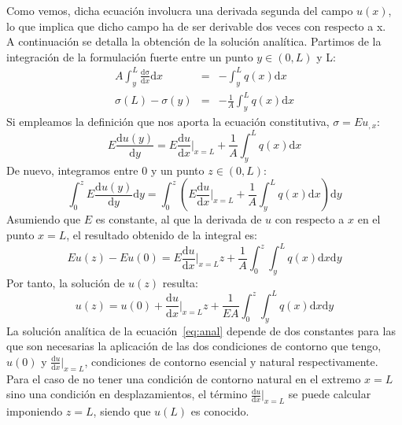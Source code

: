 Como vemos, dicha ecuación involucra una derivada segunda del campo \(u(x)\), lo que implica que dicho campo ha de ser derivable dos veces con respecto a x.\\

A continuación se detalla la obtención de la solución analítica. Partimos de la integración de la formulación fuerte entre un punto $y\in(0,L)$ y L:
\begin{eqnarray}
A \int_y^L \frac{\mathrm{d \sigma}}{\mathrm{d} x} \mathrm{d} x &=& -\int_y^L  q(x) \mathrm{d} x \\
\sigma(L)-\sigma(y) &=& -\frac{1}{A}\int_y^L  q(x) \mathrm{d} x 
\end{eqnarray}
Si empleamos la definición que nos aporta la ecuación constitutiva, $\sigma = E u_{,x}$:
\begin{equation}
E \frac{\mathrm{d} u(y)}{\mathrm{d} y} = E \frac{\mathrm{d} u}{\mathrm{d} x} \biggr\rvert_{x=L}  +\frac{1}{A}\int_y^L  q(x) \mathrm{d} x 
\end{equation}
De nuevo, integramos entre 0 y un punto $z\in(0,L)$:
\begin{equation}
\int_0^z E \frac{\mathrm{d} u(y)}{\mathrm{d} y} \mathrm{d} y = \int_0^z \left( E \frac{\mathrm{d} u}{\mathrm{d} x} \biggr\rvert_{x=L}  +\frac{1}{A}\int_y^L  q(x) \mathrm{d} x \right) \mathrm{d} y
\end{equation}
Asumiendo que $E$ es constante, al que la derivada de $u$ con respecto a $x$ en el punto $x=L$, el resultado obtenido de la integral es:
\begin{equation}
E u(z) - E u(0) = E \frac{\mathrm{d} u}{\mathrm{d} x} \biggr\rvert_{x=L} z + \frac{1}{A}\int_0^z\int_y^L  q(x) \mathrm{d} x \mathrm{d} y
\end{equation}
Por tanto, la solución de $u(z)$ resulta:
\begin{equation}\label{eq:anal}
u(z)  = u(0) +  \frac{\mathrm{d} u}{\mathrm{d} x} \biggr\rvert_{x=L} z  +\frac{1}{EA}\int_0^z\int_y^L  q(x) \mathrm{d} x \mathrm{d} y
\end{equation}
La solución analítica de la ecuación~\eqref{eq:anal} depende de dos constantes para las que son necesarias la aplicación de las dos condiciones de contorno que tengo, $u(0) $ y $\frac{\mathrm{d} u}{\mathrm{d} x} \biggr\rvert_{x=L}$, condiciones de contorno esencial y natural respectivamente. Para el caso de no tener una condición de contorno natural en el extremo $x=L$ sino una condición en desplazamientos, el término $\frac{\mathrm{d} u}{\mathrm{d} x} \biggr\rvert_{x=L}$ se puede calcular imponiendo $z=L$, siendo que $u(L)$ es conocido.

